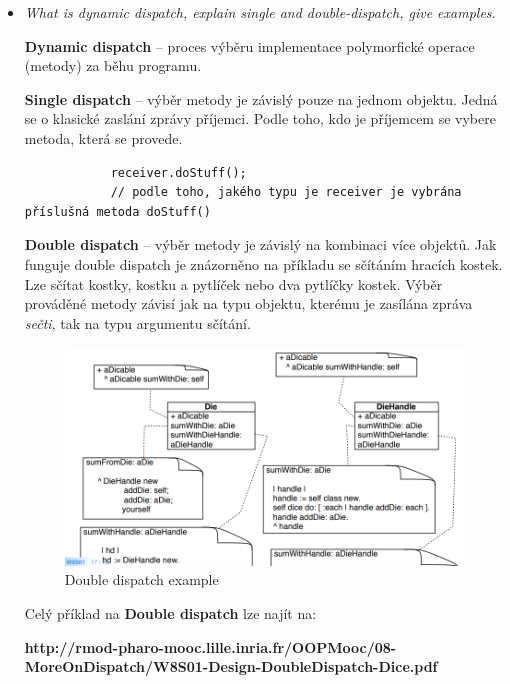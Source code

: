 \documentclass{szzclass}
\begin{document}
\begin{itemize}
      \item \textit{What is dynamic dispatch, explain single and double-dispatch, give examples.}

      \textbf{Dynamic dispatch} -- proces výběru implementace polymorfické operace (metody) za běhu programu.

      \textbf{Single dispatch} -- výběr metody je závislý pouze na jednom objektu. Jedná se o klasické
      zaslání zprávy příjemci. Podle toho, kdo je příjemcem se vybere metoda, která se provede.

      \begin{verbatim}
            receiver.doStuff();
            // podle toho, jakého typu je receiver je vybrána příslušná metoda doStuff()
      \end{verbatim}

      \textbf{Double dispatch} -- výběr metody je závislý na kombinaci více objektů. Jak funguje
      double dispatch je znázorněno na příkladu se sčítáním hracích kostek. Lze sčítat kostky,
      kostku a pytlíček nebo dva pytlíčky kostek. Výběr prováděné metody závisí jak na typu objektu,
      kterému je zasílána zpráva \textit{sečti}, tak na typu argumentu sčítání.

      \begin{figure}[h]
            \centering
            \includegraphics[width=1\textwidth]{topics/bi-wsi-si-10/double-dispatch.png}
            \caption{Double dispatch example}
      \end{figure}

      Celý příklad na \textbf{Double dispatch} lze najít na:

      \textbf{http://rmod-pharo-mooc.lille.inria.fr/OOPMooc/08-MoreOnDispatch/W8S01-Design-DoubleDispatch-Dice.pdf}


\end{itemize}
\end{document}
